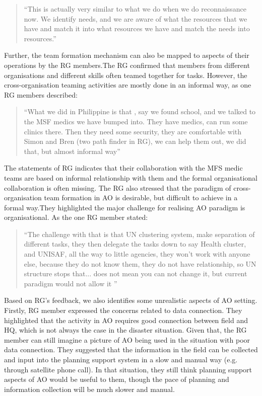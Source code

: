 \begin{quotation}
``This is actually very similar to what we do when we do reconnaissance now. We identify needs, and we are aware of what the resources that we have and match it into what resources we have and match the needs into resources.''\\
\end{quotation}

Further, the team formation mechanism can also be mapped to aspects of their operations by the \ac{RG} members.The \ac{RG} confirmed that members from different organisations and different skills often teamed together for tasks. However, the cross-organisation teaming activities are mostly done in an informal way, as one \ac{RG} members described: \\

\begin{quotation}
``What we did in Philippine is that , say we found school, and we talked to the MSF medics we have bumped into. They have medics, can run some clinics there. Then they need some security, they are comfortable with Simon and Bren (two path finder in \ac{RG}), we can help them out, we did that, but almost informal way'' \\
\end{quotation}

The statements of \ac{RG} indicates that their collaboration with the MFS medic teams are based on informal  relationship with them and the formal organisational collaboration is often missing. The \ac{RG} also stressed that the paradigm of cross-organisation team formation in \ac{AO} is desirable, but difficult to achieve in a formal way.They highlighted the major challenge for realising \ac{AO} paradigm is organisational. As the one \ac{RG} member stated:\\

\begin{quotation}
``The challenge with that is that UN clustering system, make separation of different tasks, they then delegate the tasks down to say Health cluster, and UNISAF, all the way to little agencies, they won't work with anyone else, because they do not know them, they do not have relationship, so UN structure stops that... does not mean you can not change it, but current paradigm would not allow it ''
\end{quotation}

Based on \ac{RG}'s feedback, we also identifies some unrealistic aspects of \ac{AO} setting. Firstly, \ac{RG} member expressed the concerns related to data connection. They highlighted that the activity in \ac{AO} requires good connection between field and HQ, which is not always the case in the disaster situation. Given that, the \ac{RG} member can still imagine a picture of \ac{AO} being used in the situation with poor data connection. They suggested that the information in the field can be collected and input into the planning support system in a slow and manual way (e.g. through satellite phone call). In that situation, they still think planning support aspects of \ac{AO} would be useful to them, though the pace of planning and information collection will be much slower and manual. \\

